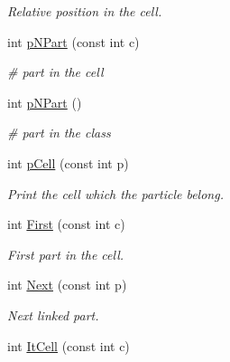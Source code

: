\begin{DoxyCompactItemize}
\begin{DoxyCompactList}\small\item\em \-Relative position in the cell. \end{DoxyCompactList}\item 
\hypertarget{classDdDoubleLoop_a6a2d62432ffa4c509f4a7f1fb5aa7630}{int \hyperlink{classDdDoubleLoop_a6a2d62432ffa4c509f4a7f1fb5aa7630}{p\-N\-Part} (const int c)}\label{classDdDoubleLoop_a6a2d62432ffa4c509f4a7f1fb5aa7630}

\begin{DoxyCompactList}\small\item\em \# part in the cell \end{DoxyCompactList}\item 
\hypertarget{classDdDoubleLoop_a388622b5e7d2ad20e8ac1a8a951d655f}{int \hyperlink{classDdDoubleLoop_a388622b5e7d2ad20e8ac1a8a951d655f}{p\-N\-Part} ()}\label{classDdDoubleLoop_a388622b5e7d2ad20e8ac1a8a951d655f}

\begin{DoxyCompactList}\small\item\em \# part in the class \end{DoxyCompactList}\item 
\hypertarget{classDdDoubleLoop_a2d9507d25b2164c0bf4282b38b4a5d88}{int \hyperlink{classDdDoubleLoop_a2d9507d25b2164c0bf4282b38b4a5d88}{p\-Cell} (const int p)}\label{classDdDoubleLoop_a2d9507d25b2164c0bf4282b38b4a5d88}

\begin{DoxyCompactList}\small\item\em \-Print the cell which the particle belong. \end{DoxyCompactList}\item 
\hypertarget{classDdDoubleLoop_aafe289a3b1eb08ed1b960f1f93e8d836}{int \hyperlink{classDdDoubleLoop_aafe289a3b1eb08ed1b960f1f93e8d836}{\-First} (const int c)}\label{classDdDoubleLoop_aafe289a3b1eb08ed1b960f1f93e8d836}

\begin{DoxyCompactList}\small\item\em \-First part in the cell. \end{DoxyCompactList}\item 
\hypertarget{classDdDoubleLoop_a8b3b22221e5f8d516a2c4818bea703ad}{int \hyperlink{classDdDoubleLoop_a8b3b22221e5f8d516a2c4818bea703ad}{\-Next} (const int p)}\label{classDdDoubleLoop_a8b3b22221e5f8d516a2c4818bea703ad}

\begin{DoxyCompactList}\small\item\em \-Next linked part. \end{DoxyCompactList}\item 
\hypertarget{classDdDoubleLoop_af415aae03ca33a44460cc0a84bda0f6d}{int \hyperlink{classDdDoubleLoop_af415aae03ca33a44460cc0a84bda0f6d}{\-It\-Cell} (const int c)}\label{classDdDoubleLoop_af415aae03ca33a44460cc0a84bda0f6d}


\end{DoxyCompactItemize}
